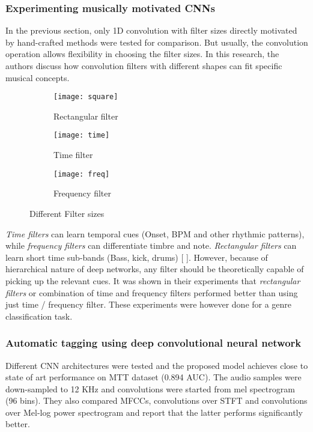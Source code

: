 \subsubsection{Experimenting musically motivated CNNs}
In the previous section, only 1D convolution with filter sizes directly motivated by hand-crafted methods were tested for comparison. But usually, the convolution operation allows flexibility in choosing the filter sizes. In this research, the authors discuss how convolution filters with different shapes can fit specific musical concepts. 
\begin{figure}[h]
       \begin{subfigure}[b]{0.3\textwidth}
        \texttt{[image: square]}
        \caption{Rectangular filter }
        \label{fig:square}
       \end{subfigure}
	    \begin{subfigure}[b]{0.3\textwidth}
        \texttt{[image: time]}
        \caption{
        Time filter
        }
        \label{fig:time}
       \end{subfigure}
       	    \begin{subfigure}[b]{0.3\textwidth}
        \texttt{[image: freq]}
        \caption{
        Frequency filter
        }
        \label{fig:freq}
       \end{subfigure}
       \caption{Different Filter sizes}\label{fig:STFT}
\end{figure}
\FloatBarrier
\bigskip 
\noindent \textit{Time filters} can learn temporal cues (Onset, BPM and other rhythmic patterns), while \textit{frequency filters} can differentiate timbre and note. \textit{Rectangular filters} can learn short time sub-bands (Bass, kick, drums) [ ]. However, because of hierarchical nature of deep networks, any filter should be theoretically capable of picking up the relevant cues. It was shown in their experiments that \textit{rectangular filters} or combination of time and frequency filters performed better than using just time / frequency filter. These experiments were however done for a genre classification task.  

\subsubsection{Automatic tagging using deep convolutional neural network}
Different CNN architectures were tested and the proposed model achieves close to state of art performance on MTT dataset (0.894 AUC). The audio samples were down-sampled to 12 KHz and convolutions were started from mel spectrogram (96 bins). They also compared MFCCs, convolutions over STFT and convolutions over Mel-log power spectrogram and report that the latter performs significantly better. 

